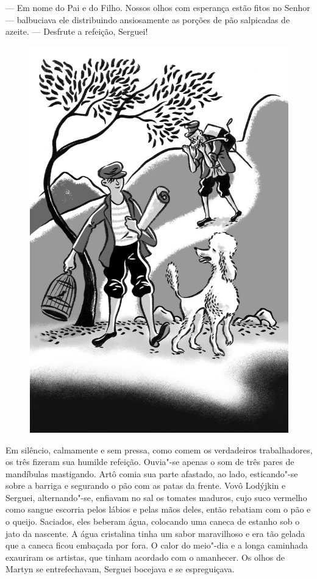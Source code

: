 --- Em nome do Pai e do Filho. Nossos olhos com esperança estão fitos no
Senhor --- balbuciava ele distribuindo ansiosamente as porções de pão
salpicadas de azeite. --- Desfrute a refeição, Serguei!

\begin{figure}%
\vspace*{-1.6cm}
\hspace*{-2.3cm}\includegraphics{./imgs/cena10.jpg}
\end{figure}

Em silêncio, calmamente e sem pressa, como comem os verdadeiros
trabalhadores, os três fizeram sua humilde refeição. Ouvia"-se apenas o
som de três pares de mandíbulas mastigando. Artô comia sua parte
afastado, ao lado, esticando"-se sobre a barriga e segurando o pão com as
patas da frente. Vovô Lodýjkin e Serguei, alternando"-se, enfiavam no sal
os tomates maduros, cujo suco vermelho como sangue escorria pelos lábios
e pelas mãos deles, então rebatiam com o pão e o queijo. Saciados, eles
beberam água, colocando uma caneca de estanho sob o jato da nascente. A
água cristalina tinha um sabor maravilhoso e era tão gelada que a
caneca ficou embaçada por fora. O calor do meio"-dia e a longa caminhada
exauriram os artistas, que tinham acordado com o amanhecer. Os olhos de
Martyn se entrefechavam, Serguei bocejava e se espreguiçava.

